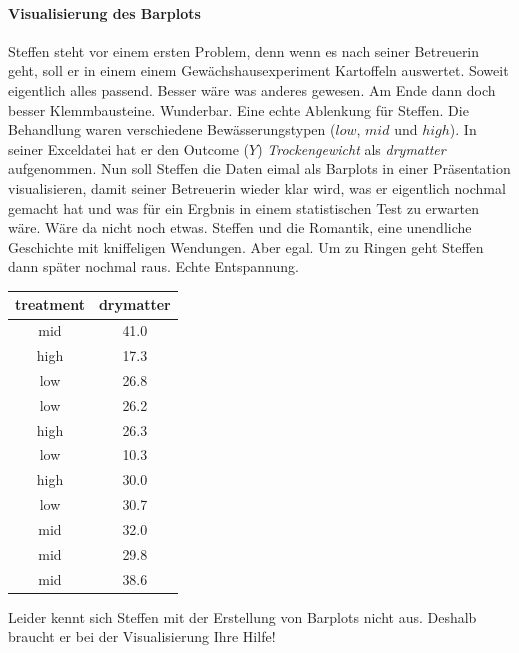 \documentclass[a4paper, 9pt]{scrartcl}\usepackage[]{graphicx}\usepackage[]{xcolor}
\begin{document}
\ifcollection
\paragraph{Visualisierung des Barplots}
\fi

Steffen steht vor einem ersten Problem, denn wenn es nach seiner Betreuerin geht, soll er in einem einem Gewächshausexperiment Kartoffeln auswertet. Soweit eigentlich alles passend. Besser wäre was anderes gewesen. Am Ende dann doch besser Klemmbausteine. Wunderbar. Eine echte Ablenkung für Steffen. Die Behandlung waren verschiedene Bewässerungstypen ($low$, $mid$ und $high$). In seiner Exceldatei hat er den Outcome ($Y$) \textit{Trockengewicht} als \textit{drymatter} aufgenommen. Nun soll Steffen die Daten eimal als Barplots in einer Präsentation visualisieren, damit seiner Betreuerin wieder klar wird, was er eigentlich nochmal gemacht hat und was für ein Ergbnis in einem statistischen Test zu erwarten wäre. Wäre da nicht noch etwas. Steffen und die Romantik, eine unendliche Geschichte mit kniffeligen Wendungen. Aber egal. Um zu Ringen geht Steffen dann später nochmal raus. Echte Entspannung.

\begin{table}[!h]
\centering
\begin{tabular}{cc}
\toprule
treatment & drymatter\\
\midrule
mid & 41.0\\
high & 17.3\\
low & 26.8\\
low & 26.2\\
high & 26.3\\
\addlinespace
low & 10.3\\
high & 30.0\\
low & 30.7\\
mid & 32.0\\
mid & 29.8\\
\addlinespace
mid & 38.6\\
\bottomrule
\end{tabular}
\end{table}



Leider kennt sich Steffen mit der Erstellung von Barplots nicht aus. Deshalb braucht er bei der Visualisierung Ihre Hilfe!
\end{document}
